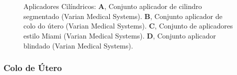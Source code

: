 \documentclass[11pt,a4paper]{article}
\begin{document}
	\begin{figure}[h]
		\centering
		 \\ %
		 \\ %
		\caption{Aplicadores Cilíndricos: \textbf{A}, Conjunto aplicador de cilindro segmentado (Varian Medical Systems). \textbf{B}, Conjunto aplicador de colo do útero (Varian Medical Systems). \textbf{C}, Conjunto de aplicadores estilo Miami (Varian Medical Systems). \textbf{D}, Conjunto aplicador blindado (Varian Medical Systems).}
		\label{fig:cilindros}
	\end{figure}

\subsubsection*{Colo de Útero}
\end{document}
